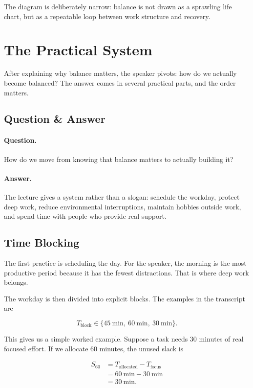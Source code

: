 The diagram is deliberately narrow: balance is not drawn as a sprawling life chart, but as a repeatable loop between work structure and recovery.

\section{The Practical System}

After explaining why balance matters, the speaker pivots: how do we actually become balanced? The answer comes in several practical parts, and the order matters.

\subsection{Question \& Answer}

\paragraph{Question.}
How do we move from knowing that balance matters to actually building it?

\paragraph{Answer.}
The lecture gives a system rather than a slogan: schedule the workday, protect deep work, reduce environmental interruptions, maintain hobbies outside work, and spend time with people who provide real support.

\subsection{Time Blocking}

The first practice is scheduling the day. For the speaker, the morning is the most productive period because it has the fewest distractions. That is where deep work belongs.

The workday is then divided into explicit blocks. The examples in the transcript are

\begin{equation}
T_{\mathrm{block}} \in
\{45\ \mathrm{min},\ 60\ \mathrm{min},\ 30\ \mathrm{min}\}.
\end{equation}

This gives us a simple worked example. Suppose a task needs \(30\) minutes of real focused effort. If we allocate \(60\) minutes, the unused slack is

\begin{align}
S_{60}
&=
T_{\mathrm{allocated}} - T_{\mathrm{focus}}  \\
&=
60\ \mathrm{min} - 30\ \mathrm{min} \\
&=
30\ \mathrm{min}.
\end{align}

